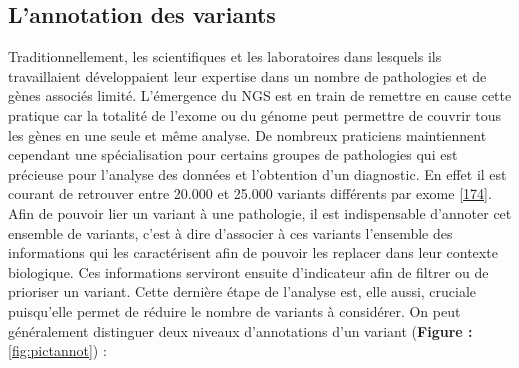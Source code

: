 \documentclass[12pt,a4paper,twoside]{ugathesis}
\theoremstyle{definition}
\theoremstyle{definition}
\theoremstyle{definition}
\theoremstyle{remark}
\begin{document}
\newpage

\subsection{L'annotation des variants}\label{lannotation-des-variants}

Traditionnellement, les scientifiques et les laboratoires dans lesquels
ils travaillaient développaient leur expertise dans un nombre de
pathologies et de gènes associés limité. L'émergence du NGS est en train
de remettre en cause cette pratique car la totalité de l'exome ou du
génome peut permettre de couvrir tous les gènes en une seule et même
analyse. De nombreux praticiens maintiennent cependant une
spécialisation pour certains groupes de pathologies qui est précieuse
pour l'analyse des données et l'obtention d'un diagnostic. En effet il
est courant de retrouver entre 20.000 et 25.000 variants différents par
exome {[}\protect\hyperlink{ref-Gonzaga-Jauregui2012}{174}{]}. Afin de
pouvoir lier un variant à une pathologie, il est indispensable d'annoter
cet ensemble de variants, c'est à dire d'associer à ces variants
l'ensemble des informations qui les caractérisent afin de pouvoir les
replacer dans leur contexte biologique. Ces informations serviront
ensuite d'indicateur afin de filtrer ou de prioriser un variant. Cette
dernière étape de l'analyse est, elle aussi, cruciale puisqu'elle permet
de réduire le nombre de variants à considérer. On peut généralement
distinguer deux niveaux d'annotations d'un variant (\textbf{Figure :}
\ref{fig:pictannot}) :
\end{document}
